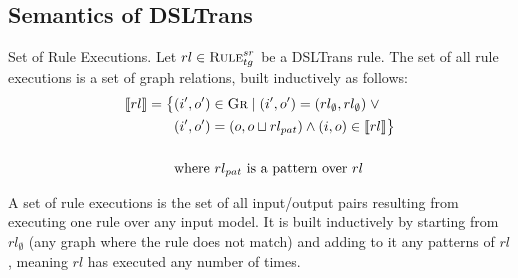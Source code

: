 \subsection{Semantics of DSLTrans}

\begin{definition}{Set of Rule Executions.}
\label{def:rule_exec_set}
Let $rl\in \textsc{Rule}^{sr}_{tg}$ be a DSLTrans rule. The set of all rule
executions is a set of graph relations, built inductively as follows:
\begin{align*}
\llbracket rl\rrbracket =\big\{&(i',o')\in \textsc{Gr}\;\lvert\;(i',o') =
(rl_{\emptyset},rl_{\emptyset})\;\lor \\&(i',o') = (o,o\sqcup rl_{pat})\land
(i,o)\in \llbracket rl\rrbracket \big\}\\\\
&\text{where } rl_{pat} \text{ is a pattern over } rl
\end{align*} 
\end{definition}

A set of rule executions is the set of all input/output pairs resulting from
executing one rule over any input model. It is built inductively by starting
from $rl_{\emptyset}$ (any graph where the rule does not match) and adding to it
any patterns of $rl$, meaning $rl$ has executed any number of times.

